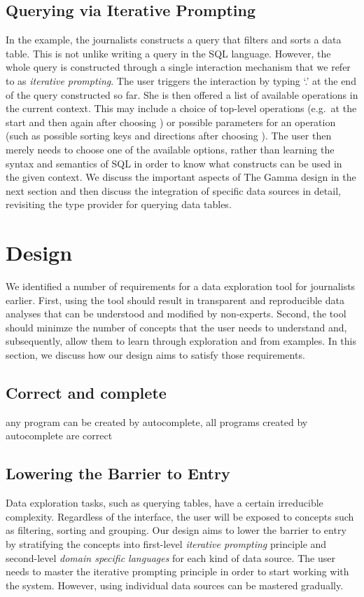 \documentclass[manuscript,review,anonymous]{acmart}
\begin{document}
\subsection{Querying via Iterative Prompting}
In the example, the journalists constructs a query that filters and sorts a data table. This is
not unlike writing a query in the SQL language. However, the whole query is constructed through
a single interaction mechanism that we refer to as \emph{iterative prompting}. The user triggers
the interaction by typing `.' at the end of the query constructed so far. She is then offered a
list of available operations in the current context. This may include a choice of top-level
operations (e.g.~at the start and then again after choosing ) or possible
parameters for an operation (such as possible sorting keys and directions after choosing
). The user then merely needs to choose one of the available options, rather than
learning the syntax and semantics of SQL in order to know what constructs can be used in the
given context.
We discuss the important aspects of The Gamma design in the next section and then discuss the
integration of specific data sources in detail, revisiting the type provider for querying
data tables.


\section{Design}
\label{sec:design}

We identified a number of requirements for a data exploration tool for journalists earlier.
First, using the tool should result in transparent and reproducible data analyses that can be
understood and modified by non-experts. Second, the tool should minimze the number of concepts
that the user needs to understand and, subsequently, allow them to learn through exploration
and from examples. In this section, we discuss how our design aims to satisfy those requirements.

\subsection{Correct and complete}
any program can be created by autocomplete, all programs created by autocomplete are correct

\subsection{Lowering the Barrier to Entry}
Data exploration tasks, such as querying tables, have a certain irreducible complexity.
Regardless of the interface, the user will be exposed to concepts such as filtering,
sorting and grouping. Our design aims to lower the barrier to entry by stratifying the concepts
into first-level \emph{iterative prompting} principle and second-level \emph{domain specific
languages} for each kind of data source.
The user needs to master the iterative prompting principle in order to start working
with the system. However, using individual data sources can be mastered gradually.
\end{document}
